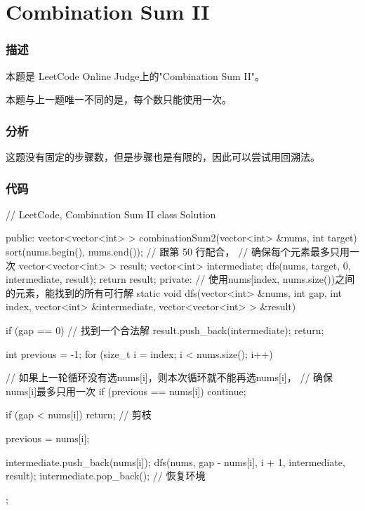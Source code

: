 \section{Combination Sum II} %

\subsubsection{描述}
本题是 LeetCode Online Judge上的"Combination Sum II"。

本题与上一题唯一不同的是，每个数只能使用一次。

\subsubsection{分析}
这题没有固定的步骤数，但是步骤也是有限的，因此可以尝试用回溯法。

\subsubsection{代码}
\begin{Codex}[label=combination_sum2.cpp]
// LeetCode, Combination Sum II
class Solution {
public:
    vector<vector<int> > combinationSum2(vector<int> &nums, int target) {
        sort(nums.begin(), nums.end()); // 跟第 50 行配合，
                                             // 确保每个元素最多只用一次
        vector<vector<int> > result;
        vector<int> intermediate;
        dfs(nums, target, 0, intermediate, result);
        return result;
    }
private:
    // 使用nums[index, nums.size())之间的元素，能找到的所有可行解
    static void dfs(vector<int> &nums, int gap, int index,
            vector<int> &intermediate, vector<vector<int> > &result) {
        if (gap == 0) {  //  找到一个合法解
            result.push_back(intermediate);
            return;
        }

        int previous = -1;
        for (size_t i = index; i < nums.size(); i++) {
            // 如果上一轮循环没有选nums[i]，则本次循环就不能再选nums[i]，
            // 确保nums[i]最多只用一次
            if (previous == nums[i]) continue;

            if (gap < nums[i]) return;  // 剪枝

            previous = nums[i];

            intermediate.push_back(nums[i]);
            dfs(nums, gap - nums[i], i + 1, intermediate, result);
            intermediate.pop_back();  // 恢复环境
        }
    }
};
\end{Codex}



